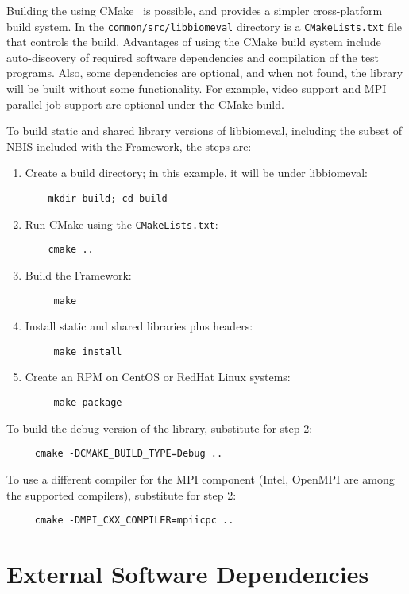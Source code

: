 Building the \sname using CMake~\cite{org:cmake} is possible, and provides
a simpler cross-platform build system. In the {\tt common/src/libbiomeval}
directory is a {\tt CMakeLists.txt} file that controls the build. Advantages
of using the CMake build system include auto-discovery of required software
dependencies and compilation of the test programs. Also, some dependencies
are optional, and when not found, the library will be built without some
functionality. For example, video support and MPI parallel job support are
optional under the CMake build.

To build static and shared library versions of libbiomeval, including the
subset of NBIS included with the Framework, the steps are:
\begin{enumerate}
\item Create a build directory; in this example, it will be under libbiomeval:
\begin{verbatim}
    mkdir build; cd build
\end{verbatim}
\item Run CMake using the {\tt CMakeLists.txt}:
\begin{verbatim}
    cmake ..
\end{verbatim}
\item Build the Framework:
\begin{verbatim}
     make
\end{verbatim}
\item Install static and shared libraries plus headers:
\begin{verbatim}
     make install
\end{verbatim}
\item Create an RPM on CentOS or RedHat Linux systems:
\begin{verbatim}
     make package
\end{verbatim}
\end{enumerate}

To build the debug version of the library, substitute for step 2:
\begin{verbatim}
     cmake -DCMAKE_BUILD_TYPE=Debug ..
\end{verbatim}

To use a different compiler for the MPI component (Intel, OpenMPI are among
 the supported compilers), substitute for step 2:
\begin{verbatim}
     cmake -DMPI_CXX_COMPILER=mpiicpc ..
\end{verbatim}

\section{External Software Dependencies}

